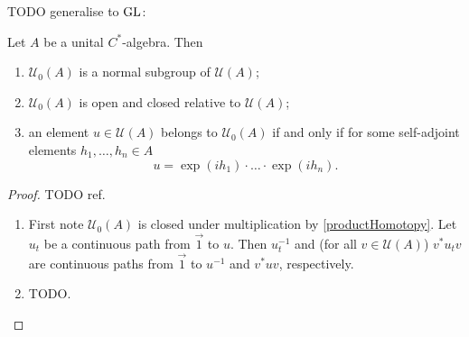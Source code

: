 TODO generalise to $\operatorname{GL}$:
\begin{lemma} \label{sectionConnectedToIdentity}
Let $A$ be a unital $C^*$-algebra. Then
\begin{enumerate}
\item $\mathcal{U}_0(A)$ is a normal subgroup of $\mathcal{U}(A)$;
\item $\mathcal{U}_0(A)$ is open and closed relative to $\mathcal{U}(A)$;
\item an element $u\in \mathcal{U}(A)$ belongs to $\mathcal{U}_0(A)$ \textup{if and only if} for some self-adjoint elements $h_1,\ldots, h_n \in A$
\[ u = \exp(ih_1)\cdot \ldots \cdot \exp(ih_n). \]
\end{enumerate}
\end{lemma}
\begin{proof}
TODO ref.
\begin{enumerate}
\item First note $\mathcal{U}_0(A)$ is closed under multiplication by \ref{productHomotopy}. Let $u_t$ be a continuous path from $\vec{1}$ to $u$. Then $u_t^{-1}$ and (for all $v\in \mathcal{U}(A)$) $v^*u_t v$ are continuous paths from $\vec{1}$ to $u^{-1}$ and $v^*uv$, respectively.
\item TODO.
\end{enumerate}
\end{proof}


